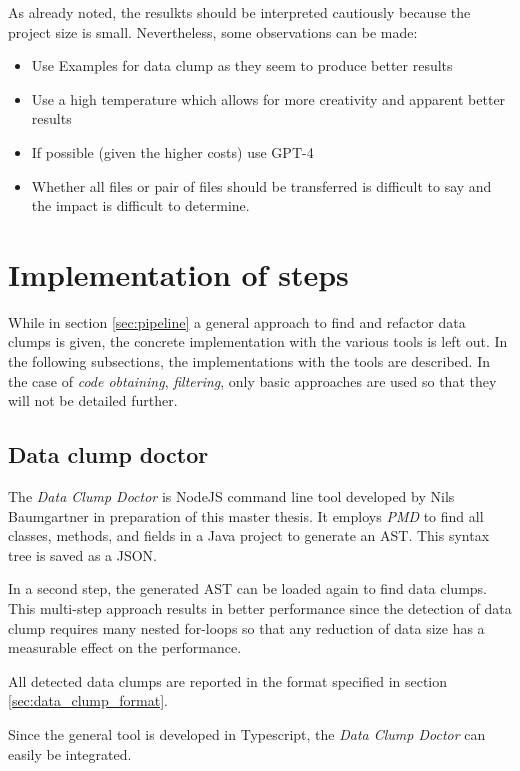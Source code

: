 As already noted, the resulkts should be interpreted cautiously because the project size is small. Nevertheless, some observations can be made:

\begin{itemize}
    \item Use Examples for data clump as they seem to produce better results
    \item Use a high temperature which allows for more creativity and apparent better results
    \item If possible (given the higher costs) use GPT-4
    \item Whether all files or pair of files should be transferred is difficult to say and the impact is difficult to determine. 
\end{itemize}
\label{sec:prompt_engineering_impl}
\section{Implementation of steps}\label{sec:step_impl}
While in section \ref{sec:pipeline} a general approach to find and refactor data clumps is given, the concrete implementation with the various tools is left out. In the following subsections, the implementations with the tools are described. In the case of \textit{code obtaining}, \textit{filtering}, only basic approaches are used so that they will not be detailed further. 


\subsection{Data clump doctor}

The  \textit{Data Clump Doctor} is NodeJS command line tool developed by Nils Baumgartner in preparation of this master thesis. It employs \textit{PMD} to find all classes, methods, and fields in a Java project to generate an \ac{AST}. This syntax tree is saved as a \ac{JSON}. 

In a second step, the generated \ac{AST} can be loaded again to find data clumps. This multi-step approach results in better performance since the detection of data clump requires many nested for-loops so that any reduction of data size has a measurable effect on the performance.

All detected data clumps are reported in the format specified in section \ref{sec:data_clump_format}.

Since the general tool is developed in Typescript, the \textit{Data Clump Doctor} can easily be integrated.


